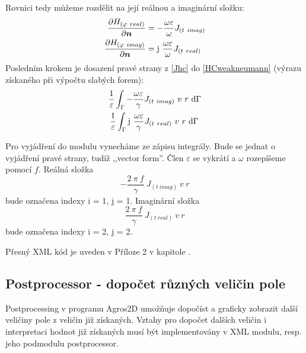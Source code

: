 \documentclass[12pt,a4paper,oneside]{article}
\numberwithin{equation}{section} %
\numberwithin{figure}{section} %
\numberwithin{table}{section} %
\newcommand{\mj}{\mathrm{j}} %
\renewcommand{\vec}[1]{\mbox{\boldmath$#1$}} %
\begin{document}
Rovnici tedy můžeme rozdělit na její reálnou a imaginární složku:
\begin{subequations}
\label{Jhc}
\begin{align}
\frac{\partial H _{(\varphi ~real)}}{\partial \vec{n}} &= - \frac{\omega \varepsilon}{\omega}  J _{(t~imag)}
\\
\frac{\partial H _{(\varphi ~imag)}}{\partial \vec{n}} &= \mj ~ \frac{\omega \varepsilon}{\omega} J _{(t~real)}
\end{align}
\end{subequations}
Posledním krokem je dosazení pravé strany z \ref{Jhc} do \ref{HCweakneumann} (výrazu získaného při výpočtu slabých forem):
\begin{subequations}
\begin{align}
\frac{1}{\varepsilon} \int _{\Gamma} - \frac{\omega \varepsilon}{\gamma} J _{(t~imag)} ~ v ~ r ~ \ud \Gamma
\\
\frac{1}{\varepsilon} \int _{\Gamma} \mj ~ \frac{\omega \varepsilon}{\gamma} J _{(t~real)} ~ v ~ r ~ \ud \Gamma ~
\end{align}
\end{subequations}

Pro vyjádření do modulu vynecháme ze zápisu integrály. Bude se jednat o vyjádření pravé strany, tudíž ,,vector form''. Člen $\varepsilon$ se vykrátí a $\omega$ rozepíšeme pomocí $f$. Reálná složka  
\begin{equation}
- \frac{2 ~ \pi ~ f}{\gamma} ~ J_{(t~imag)} ~ v ~ r
\end{equation} 
bude označena indexy i = 1, j = 1. Imaginární složka 
\begin{equation}
\frac{2 ~ \pi ~ f}{\gamma} ~ J_{(t~real)} ~ v ~ r
\end{equation}
bude označena indexy i = 2, j = 2.

Přesný XML kód je uveden v Příloze 2 v kapitole .




\subsection{Postprocessor - dopočet různých veličin pole}
\label{postprocesor}
Postprocessing v programu Agros2D umožňuje dopočíst a graficky zobrazit další veličiny pole z veličin již získaných. Vztahy pro dopočet dalších veličin i interpretaci hodnot již získaných musí být implementovány v XML modulu, resp. jeho podmodulu postprocessor.
\end{document}
